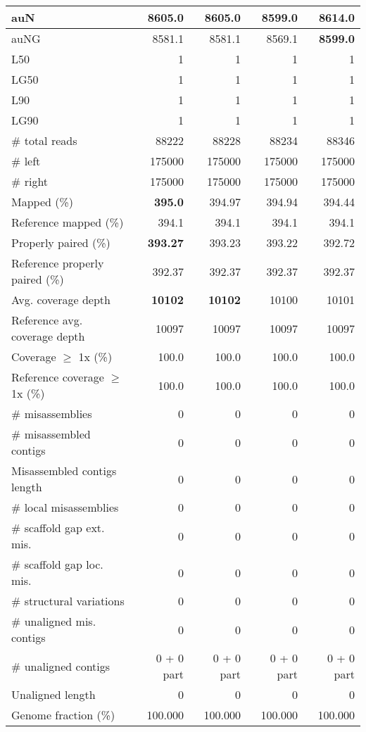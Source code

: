 \documentclass[12pt,a4paper]{article}
\begin{document}
\begin{table}[ht]
\begin{center}
\begin{tabular}{|l*{4}{|r}|}
auN & 8605.0 & 8605.0 & 8599.0 & {\bf 8614.0} \\ \hline
auNG & 8581.1 & 8581.1 & 8569.1 & {\bf 8599.0} \\ \hline
L50 & 1 & 1 & 1 & 1 \\ \hline
LG50 & 1 & 1 & 1 & 1 \\ \hline
L90 & 1 & 1 & 1 & 1 \\ \hline
LG90 & 1 & 1 & 1 & 1 \\ \hline
\# total reads & 88222 & 88228 & 88234 & 88346 \\ \hline
\# left & 175000 & 175000 & 175000 & 175000 \\ \hline
\# right & 175000 & 175000 & 175000 & 175000 \\ \hline
Mapped (\%) & {\bf 395.0} & 394.97 & 394.94 & 394.44 \\ \hline
Reference mapped (\%) & 394.1 & 394.1 & 394.1 & 394.1 \\ \hline
Properly paired (\%) & {\bf 393.27} & 393.23 & 393.22 & 392.72 \\ \hline
Reference properly paired (\%) & 392.37 & 392.37 & 392.37 & 392.37 \\ \hline
Avg. coverage depth & {\bf 10102} & {\bf 10102} & 10100 & 10101 \\ \hline
Reference avg. coverage depth & 10097 & 10097 & 10097 & 10097 \\ \hline
Coverage $\geq$ 1x (\%) & 100.0 & 100.0 & 100.0 & 100.0 \\ \hline
Reference coverage $\geq$ 1x (\%) & 100.0 & 100.0 & 100.0 & 100.0 \\ \hline
\# misassemblies & 0 & 0 & 0 & 0 \\ \hline
\# misassembled contigs & 0 & 0 & 0 & 0 \\ \hline
Misassembled contigs length & 0 & 0 & 0 & 0 \\ \hline
\# local misassemblies & 0 & 0 & 0 & 0 \\ \hline
\# scaffold gap ext. mis. & 0 & 0 & 0 & 0 \\ \hline
\# scaffold gap loc. mis. & 0 & 0 & 0 & 0 \\ \hline
\# structural variations & 0 & 0 & 0 & 0 \\ \hline
\# unaligned mis. contigs & 0 & 0 & 0 & 0 \\ \hline
\# unaligned contigs & 0 + 0 part & 0 + 0 part & 0 + 0 part & 0 + 0 part \\ \hline
Unaligned length & 0 & 0 & 0 & 0 \\ \hline
Genome fraction (\%) & 100.000 & 100.000 & 100.000 & 100.000 \\ \hline

\end{tabular}
\end{center}
\end{table}
\end{document}
